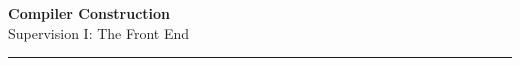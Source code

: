 \documentclass[10pt,a4paper]{exam} %
\begin{document}
\newcommand{\course}{Compiler Construction}
\newcommand{\week}{I}

\everymath{\color{campurpledark}}
\everydisplay{\color{campurpledark}}




\marksnotpoints
\pointsdroppedatright
\marksnotpoints
\marginpointname{ \points}

\begin{center}
\LARGE {\textbf{\color{campurpledark} \course} }\\[-0.2cm]
\Large \color{campurpledark} Supervision \week: The Front End\\
\end{center}

{\color{campurple}\hrule}

\newcommand{\metavar}[1]{{\color{campurple}#1}}

\vspace{0.5cm}

\newcommand{\terminal}[1]{\texttt{\color{campurple}#1}}
\newcommand{\bl}[1]{{\color{black}#1}}

\end{document}

